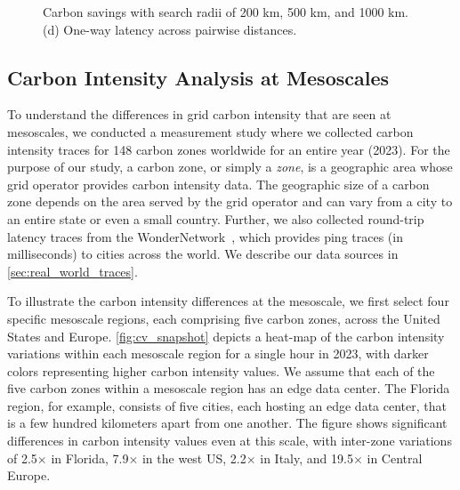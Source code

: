 \begin{figure*}[tb]
    \centering
    \hfill
    \hfill
    \hfill
    \caption{Carbon savings with search radii of 200 km, 500 km, and 1000 km. (d) One-way latency across pairwise distances.}
    \label{fig:carbon_saving_distance}
    \vspace{-.4cm}
\end{figure*}




\subsection{Carbon Intensity Analysis at Mesoscales}

To understand the differences in grid carbon intensity that are seen at mesoscales, we conducted a measurement study where we collected carbon intensity traces for 148 carbon zones worldwide for an entire year (2023). For the purpose of our study, a carbon zone, or simply a \textit{zone}, is a geographic area whose grid operator provides carbon intensity data. The geographic size of a carbon zone depends on the area served by the grid operator and can vary from a city to an entire state or even a small country. %
Further, we also collected round-trip latency traces from the WonderNetwork~\cite{wonder-proxy-2020}, which provides ping traces (in milliseconds) to cities across the world. We describe our data sources in \autoref{sec:real_world_traces}. 

To illustrate the carbon intensity differences at the mesoscale, we first select four specific mesoscale regions, each comprising five carbon zones, across the United States and Europe. \autoref{fig:cv_snapshot} depicts a heat-map of the carbon intensity variations within each mesoscale region for a single hour in 2023, with darker colors representing higher carbon intensity values. We assume that each of the five carbon zones within a mesoscale region has an edge data center. 
The Florida region, for example, consists of five cities, each hosting an edge data center, that is a few hundred kilometers apart from one another. 
The figure shows significant differences in carbon intensity values even at this scale, with inter-zone variations of 2.5$\times$ in Florida, 7.9$\times$ in the west US, 2.2$\times$ in Italy, and 19.5$\times$ in Central Europe. 

